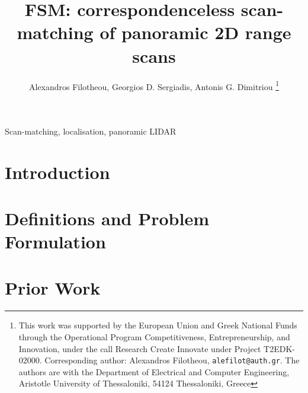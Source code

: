 \documentclass[letterpaper, 10 pt, conference]{ieeeconf}
\begin{document}
\title{\LARGE \bf FSM: correspondenceless scan-matching of panoramic 2D range scans}


\author{Alexandros Filotheou, Georgios D. Sergiadis, Antonis G. Dimitriou%
  \thanks{This work was supported by the European Union and Greek National Funds
  through the Operational Program Competitiveness, Entrepreneurship, and
  Innovation, under the call Research Create Innovate under Project T2EDK-02000.
  Corresponding author: Alexandros Filotheou, {\tt\small alefilot@auth.gr}.
  The authors are with the Department of Electrical and Computer Engineering,
  Aristotle University of Thessaloniki, 54124 Thessaloniki, Greece}
}

\maketitle
\thispagestyle{empty}
\pagestyle{empty}


\begin{abstract}
  
\end{abstract}

\begin{keywords}
Scan-matching, localisation, panoramic LIDAR
\end{keywords}

\section{Introduction}
  

\section{Definitions and Problem Formulation}
  \label{section:definitions_and_problem_formulation}
  

\section{Prior Work}
  \label{section:sota}
  
\end{document}
